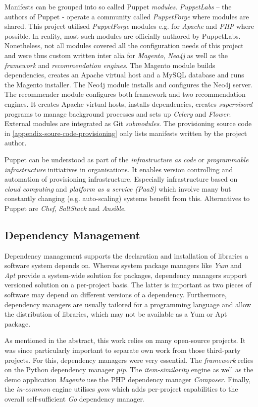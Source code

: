 Manifests can be grouped into so called Puppet \emph{modules}. \emph{PuppetLabs} -- the authors of Puppet - operate a community called \emph{PuppetForge} where modules are shared. This project utilised \emph{PuppetForge} modules e.g. for \emph{Apache} and \emph{PHP} where possible. In reality, most such modules are officially authored by PuppetLabs. Nonetheless, not all modules covered all the configuration needs of this project and were thus custom written inter alia for \emph{Magento}, \emph{Neo4j} as well as the \emph{framework} and \emph{recommendation engines}. The Magento module builds dependencies, creates an Apache virtual host and a MySQL database and runs the Magento installer. The Neo4j module installs and configures the Neo4j server. The recommender module configures both framework and two recommendation engines. It creates Apache virtual hosts, installs dependencies, creates \emph{supervisord} programs to manage background processes and sets up \emph{Celery} and \emph{Flower}. External modules are integrated as Git \emph{submodules}. The provisioning source code in \ref{appendix-soure-code-provisioning} only lists manifests written by the project author.

Puppet can be understood as part of the \emph{infrastructure as code} or \emph{programmable infrastructure} initiatives in organisations. It enables version controlling and automation of provisioning infrastructure. Especially infrastructure based on \emph{cloud computing} and \emph{platform as a service (PaaS)} which involve many but constantly changing (e.g. auto-scaling) systems benefit from this. Alternatives to Puppet are \emph{Chef}, \emph{SaltStack} and \emph{Ansible}.

\subsection{Dependency Management}

Dependency management supports the declaration and installation of libraries a software system depends on. Whereas system package managers like \emph{Yum} and \emph{Apt} provide a system-wide solution for packages, dependency managers support versioned solution on a per-project basis. The latter is important as two pieces of software may depend on different versions of a dependency. Furthermore, dependency managers are usually tailored for a programming language and allow the distribution of libraries, which may not be available as a Yum or Apt package.

As mentioned in the abstract, this work relies on many open-source projects. It was since particularly important to separate own work from those third-party projects. For this, dependency managers were very essential. The \emph{framework} relies on the Python dependency manager \emph{pip}. The \emph{item-similarity} engine as well as the demo application \emph{Magento} use the PHP dependency manager \emph{Composer}. Finally, the \emph{in-common} engine utilises \emph{gom} which adds per-project capabilities to the overall self-sufficient \emph{Go} dependency manager.